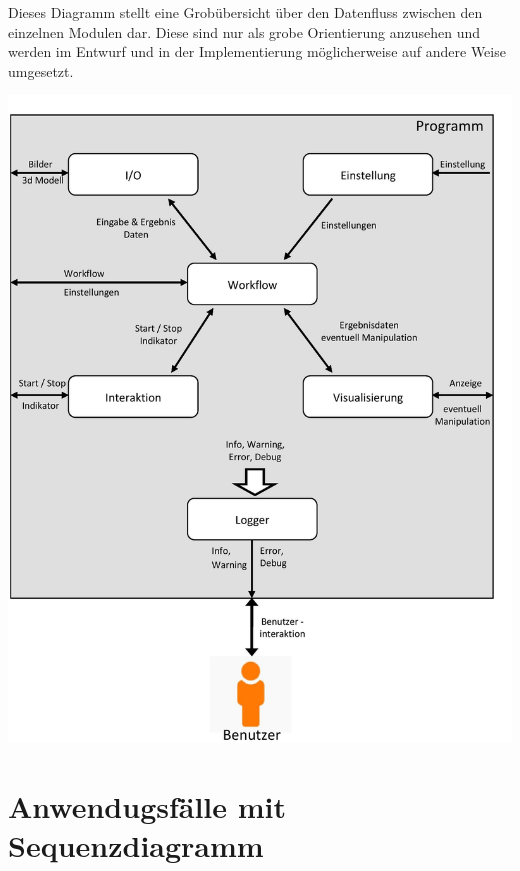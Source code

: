 Dieses Diagramm stellt eine Grobübersicht über den Datenfluss zwischen den einzelnen Modulen dar.
Diese sind nur als grobe Orientierung anzusehen und werden im Entwurf und in der Implementierung möglicherweise auf andere Weise umgesetzt.
\begin{normalsize}

\end{normalsize}
\includegraphics[scale=0.28]{img/Datenflussuebersicht.jpg} 
\newpage 
\section{Anwendugsfälle mit Sequenzdiagramm}
